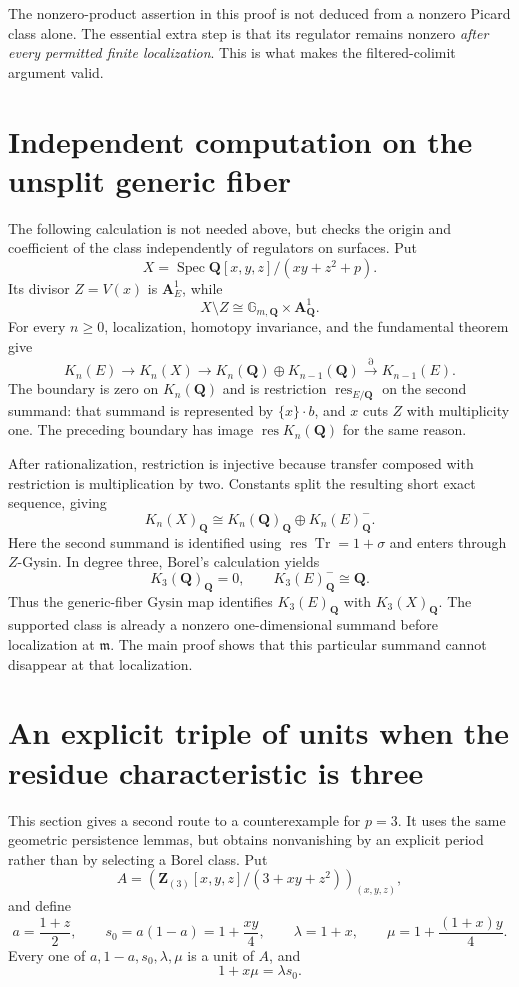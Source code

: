 \documentclass[11pt,a4paper]{article}
\theoremstyle{remark}
\newcommand{\Q}{\mathbf Q}
\newcommand{\Z}{\mathbf Z}
\newcommand{\A}{\mathbf A}
\newcommand{\m}{\mathfrak m}
\newcommand{\Spec}{\operatorname{Spec}}
\newcommand{\Qrat}{_{\Q}}
\begin{document}
The nonzero-product assertion in this proof is not deduced from a nonzero Picard class alone. The essential extra step is that its regulator remains nonzero \emph{after every permitted finite localization}. This is what makes the filtered-colimit argument valid.

\section{Independent computation on the unsplit generic fiber}

The following calculation is not needed above, but checks the origin and coefficient of the class independently of regulators on surfaces. Put
\[
X=\Spec\Q[x,y,z]/(xy+z^2+p).
\]
Its divisor $Z=V(x)$ is $\A^1_E$, while
\[
X\setminus Z\cong\mathbb G_{m,\Q}\times\A^1_{\Q}.
\]
For every $n\geq 0$, localization, homotopy invariance, and the fundamental theorem give
\[
K_n(E)\longrightarrow K_n(X)\longrightarrow
K_n(\Q)\oplus K_{n-1}(\Q)
\xrightarrow{\partial}K_{n-1}(E).
\]
The boundary is zero on $K_n(\Q)$ and is restriction $\operatorname{res}_{E/\Q}$ on the second summand: that summand is represented by $\{x\}\cdot b$, and $x$ cuts $Z$ with multiplicity one. The preceding boundary has image $\operatorname{res}K_n(\Q)$ for the same reason.

After rationalization, restriction is injective because transfer composed with restriction is multiplication by two. Constants split the resulting short exact sequence, giving
\begin{equation}\label{eq:genericdecomposition}
K_n(X)\Qrat\cong K_n(\Q)\Qrat\oplus K_n(E)\Qrat^{-}.
\end{equation}
Here the second summand is identified using $\operatorname{res}\operatorname{Tr}=1+\sigma$ and enters through $Z$-Gysin. In degree three, Borel's calculation yields
\[
K_3(\Q)\Qrat=0,\qquad K_3(E)\Qrat^{-}\cong\Q.
\]
Thus the generic-fiber Gysin map identifies $K_3(E)\Qrat$ with $K_3(X)\Qrat$. The supported class is already a nonzero one-dimensional summand before localization at $\m$. The main proof shows that this particular summand cannot disappear at that localization.

\section{An explicit triple of units when the residue characteristic is three}\label{sec:explicit}

This section gives a second route to a counterexample for $p=3$. It uses the same geometric persistence lemmas, but obtains nonvanishing by an explicit period rather than by selecting a Borel class. Put
\[
A=\left(\Z_{(3)}[x,y,z]/(3+xy+z^2)\right)_{(x,y,z)},
\]
and define
\[
a=\frac{1+z}{2},\qquad s_0=a(1-a)=1+\frac{xy}{4},\qquad
\lambda=1+x,\qquad \mu=1+\frac{(1+x)y}{4}.
\]
Every one of $a,1-a,s_0,\lambda,\mu$ is a unit of $A$, and
\begin{equation}\label{eq:unitsidentity}
1+x\mu=\lambda s_0.
\end{equation}
\end{document}
